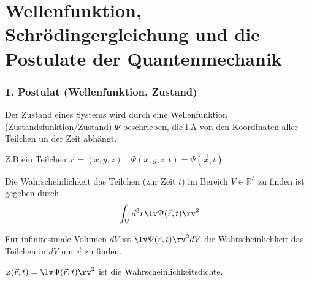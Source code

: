 \section{Wellenfunktion, Schrödingergleichung und die Postulate der
Quantenmechanik} %
\label{sec:Wellenfunktion,_Schrödingergleichung_und_die_Postulate_der_Quantenmech}
\subsubsection{1. Postulat (Wellenfunktion, Zustand)} %
\label{ssub:1._Postulat_(Wellenfunktion,_Zustand)}
Der Zustand eines \qmn Systems wird durch eine Wellenfunktion
(Zustandsfunktion/Zustand) $\Psi$ beschrieben, die i.A von den Koordinaten
aller Teilchen un der Zeit abhängt.

Z.B ein Teilchen $\vec{r}=(x,y,z) \quad \Psi(x,y,z,t)= \Psi(\vec{x},t)$

Die Wahrscheinlichkeit das Teilchen (zur Zeit $t$) im Bereich $V \in
\mathbb{R}^3$ zu finden ist gegeben durch
\begin{equation*}
    \int_V d^3 r \lv \Psi(\vec{r},t)\rv^2
\end{equation*}

Für infinitesimale Volumen $dV$ ist $\lv \Psi(\vec{r},t)\rv^2 dV$ die
Wahrscheinlichkeit das Teilchen in $dV$ um $\vec{r}$ zu finden.
    
$\varphi(\vec{r},t) = \lv \Psi(\vec{r},t)\rv^2$ ist die Wahrscheinlichkeitsdichte.

